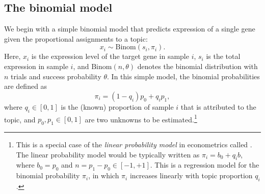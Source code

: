 \documentclass[final]{siamart171218}
\begin{document}
\subsection{The binomial model}

We begin with a simple binomial model that predicts expression of a
single gene given the proportional assignments to a topic:
\begin{equation}
x_i \sim \mathrm{Binom}(s_i, \pi_i).
\label{eq:binomial}
\end{equation}
Here, $x_i$ is the expression level of the target gene in sample $i$,
$s_i$ is the total expression in sample $i$, and $\mathrm{Binom}(n,
\theta)$ denotes the binomial distribution with $n$ trials and success
probability $\theta$. In this simple model, the binomial probabilities
are defined as
\begin{equation}
\pi_i = (1 - q_i) p_0 + q_i p_1,
\label{eq:binomial-prob}
\end{equation}
where $q_i \in [0,1]$ is the (known) proportion of sample $i$ that is
attributed to the topic, and $p_0, p_1 \in [0, 1]$ are two unknowns to
be estimated.\footnote{This is a special case of the {\em linear
    probability model} in econometrics called \cite{stock-watson}. The
  linear probability model would be typically written as $\pi_i = b_0
  + q_i b$, where $b_0 = p_0$ and $n = p_1 - p_0 \in [-1, +1]$. This
  is a regression model for the binomial probability $\pi_i$, in which
  $\pi_i$ increases linearly with topic proportion $q_i$.}
\end{document}
